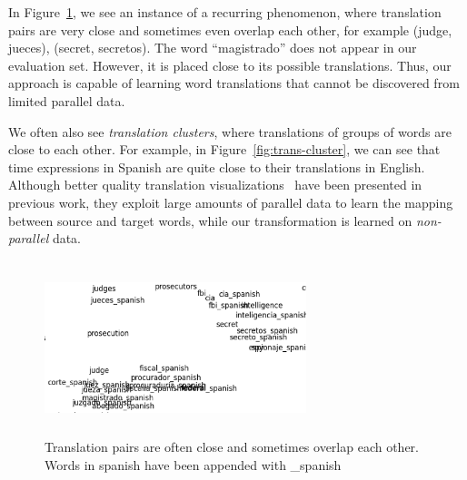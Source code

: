 In Figure~\ref{fig:overlap}, we see an instance of a recurring phenomenon, where translation pairs are very close and sometimes even overlap each other, for example (judge, jueces), (secret, secretos). The word ``magistrado'' does not appear in our evaluation set. However, it is placed close to its possible translations. Thus, our approach is capable of learning word translations that cannot be discovered from limited parallel data. 

We often also see \emph{translation clusters}, where translations of groups of words are close to each other. For example, in Figure~\ref{fig:trans-cluster}, we can see that time expressions in Spanish are quite close to their translations in English. Although better quality translation visualizations~\cite{mikolov2013exploiting} have been presented in previous work, they exploit large amounts of parallel data to learn the mapping between source and target words, while our transformation is learned on \emph{non-parallel} data. 


 \begin{figure}[!ht]
  \centering
  \includegraphics[width=3.0in,height=2.0in]{magistrado}
  \caption{Translation pairs are often close and sometimes overlap each other. Words in spanish have been appended with \_spanish}
\label{fig:overlap}
\end{figure}


